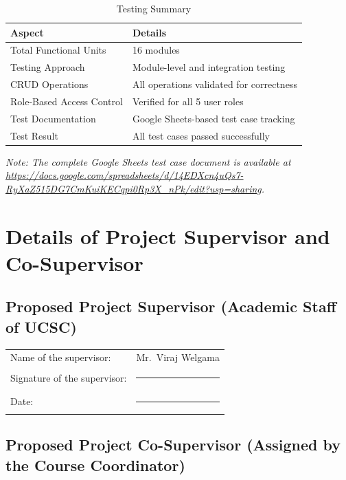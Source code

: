 \documentclass[12pt, a4paper]{report}
\begin{document}
\begin{table}[H]
\centering
\caption{Testing Summary}
\label{tab:testing-summary}
\begin{tabular}{l l}
\toprule
\textbf{Aspect} & \textbf{Details} \\
\midrule
Total Functional Units        & 16 modules \\
Testing Approach              & Module-level and integration testing \\
CRUD Operations               & All operations validated for correctness \\
Role-Based Access Control     & Verified for all 5 user roles \\
Test Documentation            & Google Sheets-based test case tracking \\
Test Result                   & All test cases passed successfully \\
\bottomrule
\end{tabular}
\end{table}

\noindent\textit{Note: The complete Google Sheets test case document is available at \url{https://docs.google.com/spreadsheets/d/14EDXcn4uQs7-RyXaZ515DG7CmKuiKECqpi0Rp3X_nPk/edit?usp=sharing}.}

\chapter{Details of Project Supervisor and Co-Supervisor}

\section*{Proposed Project Supervisor (Academic Staff of UCSC)}

\noindent
\begin{tabular}{@{} p{6cm} p{8cm} @{}}
Name of the supervisor: & Mr.\ Viraj Welgama \\[1cm]
Signature of the supervisor: & \rule{6cm}{0.4pt} \\[1cm]
Date: & \rule{6cm}{0.4pt} \\
\end{tabular}

\vspace{1cm}

\section*{Proposed Project Co-Supervisor (Assigned by the Course Coordinator)}
\end{document}
